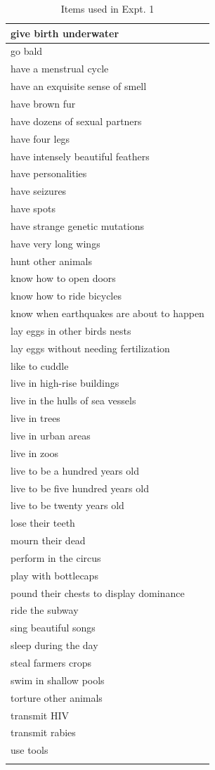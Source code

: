 \documentclass[floatsintext,doc]{apa6}
\begin{document}
\begin{longtable}{ |p{3in}|}
   \hline
give birth underwater \\ 
   \hline
go bald \\ 
   \hline
have a menstrual cycle \\ 
   \hline
have an exquisite sense of smell \\ 
   \hline
have brown fur \\ 
   \hline
have dozens of sexual partners \\ 
   \hline
have four legs \\ 
   \hline
have intensely beautiful feathers \\ 
   \hline
have personalities \\ 
   \hline
have seizures \\ 
   \hline
have spots \\ 
   \hline
have strange genetic mutations \\ 
   \hline
have very long wings \\ 
   \hline
hunt other animals \\ 
   \hline
know how to open doors \\ 
   \hline
know how to ride bicycles \\ 
   \hline
know when earthquakes are about to happen \\ 
   \hline
lay eggs in other birds nests \\ 
   \hline
lay eggs without needing fertilization \\ 
   \hline
like to cuddle \\ 
   \hline
live in high-rise buildings \\ 
   \hline
live in the hulls of sea vessels \\ 
   \hline
live in trees \\ 
   \hline
live in urban areas \\ 
   \hline
live in zoos \\ 
   \hline
live to be a hundred years old \\ 
   \hline
live to be five hundred years old \\ 
   \hline
live to be twenty years old \\ 
   \hline
lose their teeth \\ 
   \hline
mourn their dead \\ 
   \hline
perform in the circus \\ 
   \hline
play with bottlecaps \\ 
   \hline
pound their chests to display dominance \\ 
   \hline
ride the subway \\ 
   \hline
sing beautiful songs \\ 
   \hline
sleep during the day \\ 
   \hline
steal farmers crops \\ 
   \hline
swim in shallow pools \\ 
   \hline
torture other animals \\ 
   \hline
transmit HIV \\ 
   \hline
transmit rabies \\ 
   \hline
use tools \\ 
   \hline
\hline
\caption{Items used in Expt. 1} 
\end{longtable}
\endgroup

\newpage
\end{document}
